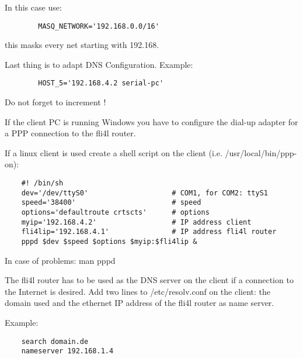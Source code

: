 \begin{description}
           In this case use:

\begin{example}
\begin{verbatim}
        MASQ_NETWORK='192.168.0.0/16'
\end{verbatim}
\end{example}

           this masks every net starting with 192.168.


           Last thing is to adapt DNS Configuration. Example:

\begin{example}
\begin{verbatim}
        HOST_5='192.168.4.2 serial-pc'
\end{verbatim}
\end{example}

           Do not forget to increment !
           
           If the client PC is running Windows you have to configure 
           the dial-up adapter for a PPP connection to the fli4l router.
           
           If a linux client is used create a shell script on the client (i.e.
           /usr/local/bin/ppp-on):
\begin{example}
\begin{verbatim}
    #! /bin/sh
    dev='/dev/ttyS0'                    # COM1, for COM2: ttyS1
    speed='38400'                       # speed
    options='defaultroute crtscts'      # options
    myip='192.168.4.2'                  # IP address client
    fli4lip='192.168.4.1'               # IP address fli4l router
    pppd $dev $speed $options $myip:$fli4lip &
\end{verbatim}
\end{example}

        In case of problems: man pppd

        
        The fli4l router has to be used as the DNS server on the client 
        if a connection to the Internet is desired. Add two lines to /etc/resolv.conf 
        on the client: the domain used and the ethernet IP address of the fli4l router 
        as name server.

        Example:

\begin{example}
\begin{verbatim}
    search domain.de
    nameserver 192.168.1.4
\end{verbatim}
\end{example}
        

\end{description}
